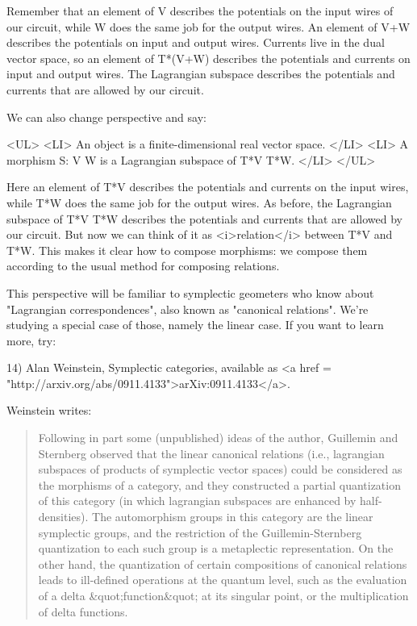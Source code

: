 Remember that an element of V describes the potentials on the input
wires of our circuit, while W does the same job for the output wires.
An element of V+W describes the potentials on input and output wires.
Currents live in the dual vector space, so an element of T*(V+W)
describes the potentials and currents on input and output wires.  The
Lagrangian subspace describes the potentials and currents that are
allowed by our circuit.

We can also change perspective and say:

<UL>
<LI>
  An object is a finite-dimensional real vector space.  
</LI>
<LI>
  A morphism S: V \to  W is a Lagrangian subspace of T*V \times  T*W.
</LI>
</UL>

Here an element of T*V describes the potentials and currents on the
input wires, while T*W does the same job for the output wires.  As
before, the Lagrangian subspace of T*V \times  T*W describes the potentials
and currents that are allowed by our circuit.  But now we can think of
it as <i>relation</i> between T*V and T*W.  This makes it clear how to
compose morphisms: we compose them according to the usual method for 
composing relations.

This perspective will be familiar to symplectic geometers who know
about "Lagrangian correspondences", also known as
"canonical relations".  We're studying a special case of
those, namely the linear case.  If you want to learn more, try:

14) Alan Weinstein, Symplectic categories, available as
<a href = "http://arxiv.org/abs/0911.4133">arXiv:0911.4133</a>.

Weinstein writes:

\begin{quote}
   Following in part some (unpublished) ideas of the author, Guillemin
   and Sternberg observed that the linear canonical relations (i.e.,
   lagrangian subspaces of products of symplectic vector spaces) could
   be considered as the morphisms of a category, and they constructed
   a partial quantization of this category (in which lagrangian subspaces
   are enhanced by half-densities).  The automorphism groups in this
   category are the linear symplectic groups, and the restriction of the
   Guillemin-Sternberg quantization to each such group is a
   metaplectic representation.  On the other hand, the quantization of
   certain compositions of canonical relations leads to ill-defined
   operations at the quantum level, such as the evaluation of a delta
   &quot;function&quot; at its singular point, or the multiplication of delta
   functions.
\end{quote}
    


